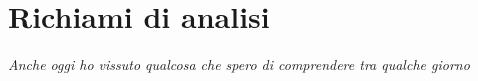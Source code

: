 \chapter{Richiami di analisi}\label{sec:richiami}
\vspace{-1.0cm}
\begin{flushright}
\textit{
Anche oggi ho vissuto qualcosa che spero di comprendere tra qualche giorno
}
\end{flushright}
\vspace{+1.0cm}
\minitoc
\newpage







% 
% 
% 

